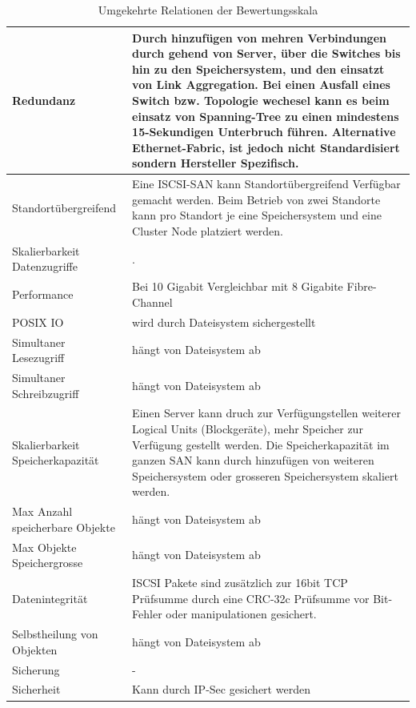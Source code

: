 \begin{table}[htbp]
\caption{Umgekehrte Relationen der Bewertungsskala}
\begin{tabular}{|L{3.5cm}|L{10cm}|}
\hline
Redundanz & Durch hinzufügen von mehren Verbindungen durch gehend von Server, über die Switches bis hin zu den Speichersystem, und den einsatzt von Link Aggregation. Bei einen Ausfall eines Switch bzw. Topologie wechesel kann es beim einsatz von Spanning-Tree zu einen mindestens 15-Sekundigen Unterbruch führen. Alternative Ethernet-Fabric, ist jedoch nicht Standardisiert sondern Hersteller Spezifisch. \\ \hline
Standortübergreifend & Eine ISCSI-SAN kann Standortübergreifend Verfügbar gemacht werden. Beim Betrieb von zwei Standorte kann pro Standort je eine Speichersystem und eine Cluster Node platziert werden. \\ \hline
Skalierbarkeit Datenzugriffe & . \\ \hline
Performance & Bei 10 Gigabit Vergleichbar mit 8 Gigabite Fibre-Channel \\ \hline
POSIX IO & wird durch Dateisystem sichergestellt \\ \hline
Simultaner Lesezugriff & hängt von Dateisystem ab \\ \hline
Simultaner Schreibzugriff & hängt von Dateisystem ab \\ \hline
Skalierbarkeit Speicherkapazität & Einen Server kann druch zur Verfügungstellen weiterer Logical Units (Blockgeräte), mehr Speicher zur Verfügung gestellt werden. Die Speicherkapazität im ganzen SAN kann durch hinzufügen von weiteren Speichersystem oder grosseren Speichersystem skaliert werden. \\ \hline
Max Anzahl speicherbare Objekte & hängt von Dateisystem ab \\ \hline
Max Objekte Speichergrosse & hängt von Dateisystem ab \\ \hline
Datenintegrität & ISCSI Pakete sind zusätzlich zur 16bit TCP Prüfsumme durch eine CRC-32c Prüfsumme vor Bit-Fehler oder manipulationen gesichert. \\ \hline
Selbstheilung von Objekten & hängt von Dateisystem ab \\ \hline
Sicherung & - \\ \hline
Sicherheit & Kann durch IP-Sec gesichert werden \\ \hline
\end{tabular}
\label{UmgekehrteBewertungsskala}
\end{table}


